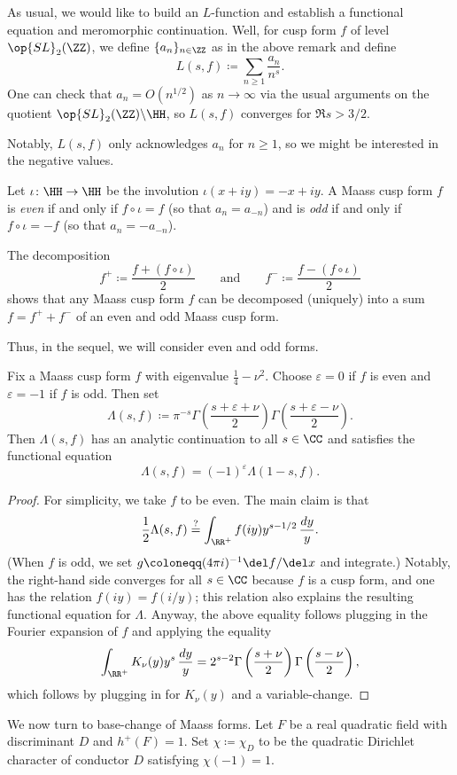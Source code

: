 \documentclass{article}
\begin{document}
As usual, we would like to build an $L$-function and establish a functional equation and meromorphic continuation. Well, for cusp form $f$ of level $\op{SL}_2(\ZZ)$, we define $\{a_n\}_{n\in\ZZ}$ as in the above remark and define
\[L(s,f)\coloneqq\sum_{n\ge1}\frac{a_n}{n^s}.\]
One can check that $a_n=O\left(n^{1/2}\right)$ as $n\to\infty$ via the usual arguments on the quotient $\op{SL}_2(\ZZ)\backslash\HH$, so $L(s,f)$ converges for $\Re s>3/2$.

Notably, $L(s,f)$ only acknowledges $a_n$ for $n\ge1$, so we might be interested in the negative values.
\begin{definition}
	Let $\iota\colon\HH\to\HH$ be the involution $\iota(x+iy)=-x+iy$. A Maass cusp form $f$ is \textit{even} if and only if $f\circ\iota=f$ (so that $a_n=a_{-n}$) and is \textit{odd} if and only if $f\circ\iota=-f$ (so that $a_n=-a_{-n}$).
\end{definition}
\begin{remark}
	The decomposition
	\[f^+\coloneqq\frac{f+(f\circ\iota)}2\qquad\text{and}\qquad f^-\coloneqq\frac{f-(f\circ\iota)}2\]
	shows that any Maass cusp form $f$ can be decomposed (uniquely) into a sum $f=f^++f^-$ of an even and odd Maass cusp form.
\end{remark}
Thus, in the sequel, we will consider even and odd forms.
\begin{proposition}
	Fix a Maass cusp form $f$ with eigenvalue $\frac14-\nu^2$. Choose $\varepsilon=0$ if $f$ is even and $\varepsilon=-1$ if $f$ is odd. Then set
	\[\Lambda(s,f)\coloneqq\pi^{-s}\Gamma\left(\frac{s+\varepsilon+\nu}2\right)\Gamma\left(\frac{s+\varepsilon-\nu}2\right).\]
	Then $\Lambda(s,f)$ has an analytic continuation to all $s\in\CC$ and satisfies the functional equation
	\[\Lambda(s,f)=(-1)^\varepsilon\Lambda(1-s,f).\]
\end{proposition}
\begin{proof}
	For simplicity, we take $f$ to be even. The main claim is that
	\[\frac12\Lambda(s,f)\stackrel?=\int_{\RR^+}f(iy)y^{s-1/2}\,\frac{dy}y.\]
	(When $f$ is odd, we set $g\coloneqq(4\pi i)^{-1}\del f/\del x$ and integrate.) Notably, the right-hand side converges for all $s\in\CC$ because $f$ is a cusp form, and one has the relation $f(iy)=f(i/y)$; this relation also explains the resulting functional equation for $\Lambda$. Anyway, the above equality follows plugging in the Fourier expansion of $f$ and applying the equality
	\[\int_{\RR^+}K_\nu(y)y^s\,\frac{dy}y=2^{s-2}\Gamma\left(\frac{s+\nu}2\right)\Gamma\left(\frac{s-\nu}2\right),\]
	which follows by plugging in for $K_\nu(y)$ and a variable-change.
\end{proof}
We now turn to base-change of Maass forms. Let $F$ be a real quadratic field with discriminant $D$ and $h^+(F)=1$. Set $\chi\coloneqq\chi_D$ to be the quadratic Dirichlet character of conductor $D$ satisfying $\chi(-1)=1$.
\end{document}
